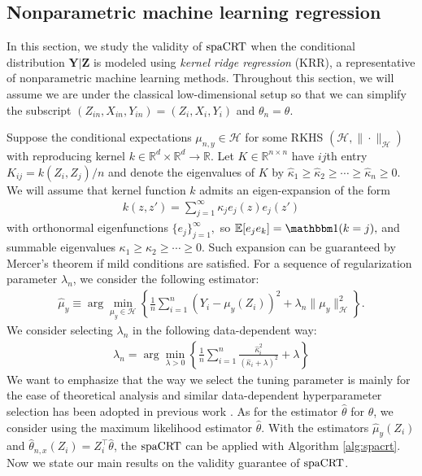 \documentclass[12pt]{article}
\theoremstyle{definition}
\newcommand{\E}{\mathbb E}								%
\newcommand{\indicator}{\mathbbm 1}						%
\newcommand{\srx}{X}									%
\newcommand{\prz}{\bm Z}								%
\newcommand{\srz}{Z}									%
\newcommand{\pry}{{\bm Y}}								%
\newcommand{\sry}{Y}									%
\newcommand{\spacrt}{\textnormal{spaCRT}}               %
\begin{document}
\subsection{Nonparametric machine learning regression}\label{sec:special_results_nonparametric}

In this section, we study the validity of $\spacrt$ when the conditional distribution $\pry|\prz$ is modeled using \textit{kernel ridge regression} (KRR), a representative of nonparametric machine learning methods. Throughout this section, we will assume we are under the classical low-dimensional setup so that we can simplify the subscript $(\srz_{in},\srx_{in},\sry_{in})=(\srz_{i},\srx_{i},\sry_{i})$ and $\theta_n=\theta$. 

Suppose the conditional expectations $\mu_{n,y}\in\mathcal{H}$ for some RKHS $(\mathcal{H},\|\cdot\|_{\mathcal{H}})$ with reproducing kernel $k\in\mathbb{R}^{d}\times \mathbb{R}^d\rightarrow\mathbb{R}$. Let $K\in\mathbb{R}^{n\times n}$ have $ij$th entry $K_{ij}=k(\srz_{i},\srz_{j})/n$ and denote the eigenvalues of $K$ by $\widehat{\kappa}_{1}\geq\widehat{\kappa}_2\geq\cdots\geq\widehat{\kappa}_n\geq 0$. We will assume that kernel function $k$ admits an eigen-expansion of the form 
\begin{align}\label{eq:eigven_expansion}
  k(z,z')=\sum_{j=1}^{\infty}\kappa_{j}e_j(z)e_j(z')
\end{align}
with orthonormal eigenfunctions $\{e_{j}\}_{j=1}^{\infty},$ so $\E[e_je_k]=\indicator(k=j),$ and summable eigenvalues $\kappa_1\geq\kappa_2\geq\cdots\geq0$. Such expansion can be guaranteed by Mercer's theorem if mild conditions are satisfied. For a sequence of regularization parameter $\lambda_n$, we consider the following estimator:
\begin{align}\label{eq:KRR_mu_y}
  \widehat{\mu}_{y}\equiv\arg\min_{\mu_{y}\in\mathcal{H}} \left\{\frac{1}{n}\sum_{i=1}^n (\sry_{i}-\mu_{y}(\srz_{i}))^2+\lambda_n\|\mu_{y}\|_{\mathcal{H}}^2\right\}.
\end{align}
We consider selecting $\lambda_n$ in the following data-dependent way:
\begin{align}\label{eq:lambda_n}
  \lambda_n=\arg\min_{\lambda>0}\left\{\frac{1}{n}\sum_{i=1}^n\frac{\widehat{\kappa}_i^2}{(\widehat{\kappa}_i+\lambda)^2}+\lambda\right\}
\end{align}
We want to emphasize that the way we select the tuning parameter is mainly for the ease of theoretical analysis and similar data-dependent hyperparameter selection has been adopted in previous work \citet{Niu2022a,Shah2018}. As for the estimator $\widehat{\theta}$ for $\theta$, we consider using the maximum likelihood estimator $\widehat{\theta}$. With the estimators $\widehat{\mu}_{y}(\srz_{i})$ and $\widehat{\theta}_{n,x}(\srz_{i})=\srz_{i}^\top\widehat{\theta}$, the $\spacrt$ can be applied with Algorithm \ref{alg:spacrt}. Now we state our main results on the validity guarantee of $\spacrt$.
\end{document}
